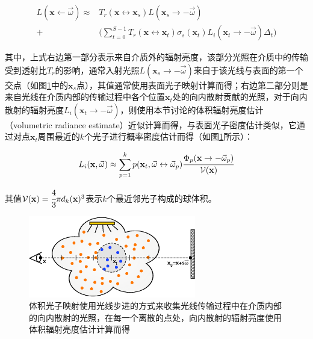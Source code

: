 \begin{equation}
\begin{aligned}
	L(\mathbf{x}\leftarrow\vec{\omega})\approx &T_r(\mathbf{x}\leftrightarrow\mathbf{x}_s)L(\mathbf{x}_s\to -\vec{\omega})\\ +&\Biggl(\sum^{S-1}_{t=0}T_r(\mathbf{x}\leftrightarrow\mathbf{x}_t)\sigma_s(\mathbf{x}_t)L_i(\mathbf{x}_t\to -\vec{\omega})\Delta_t\Biggl)
\end{aligned}
\end{equation}

其中，上式右边第一部分表示来自介质外的辐射亮度，该部分光照在介质中的传输受到透射比$T_r$的影响，通常入射光照$L(\mathbf{x}_s\to -\vec{\omega})$来自于该光线与表面的第一个交点（如图\ref{f:pm-vpm-ray-marching}中的$\mathbf{x}_s$点），其值通常使用表面光子映射计算而得；右边第二部分则是来自光线在介质内部的传输过程中各个位置$\mathbf{x}_t$处的向内散射贡献的光照，对于向内散射的辐射亮度$L_i(\mathbf{x}_t\to -\vec{\omega})$，则使用本节讨论的体积辐射亮度估计（volumetric radiance estimate）近似计算而得，与表面光子密度估计类似，它通过对点$\mathbf{x}_t$周围最近的$k$个光子进行概率密度估计而得（如图\ref{f:pm-vpm-ray-marching}所示）：

\begin{equation}
	L_i(\mathbf{x},\vec{\omega})\approx\sum^{k}_{p=1}p(\mathbf{x}_t,\vec{\omega}\leftrightarrow\vec{\omega}_p) \cfrac{\Phi_p(\mathbf{x}\to-\vec{\omega}_p)}{\mathcal{V}(\mathbf{x})}
\end{equation}

\noindent 其值$\mathcal{V}(\mathbf{x})= \cfrac{4}{3}\pi d_k(\mathbf{x})^{3}$表示$k$个最近邻光子构成的球体积。

\begin{figure}
	\sidecaption
	\includegraphics[width=0.65\textwidth]{figures/pm/vpm-ray-marching}
	\caption{体积光子映射使用光线步进的方式来收集光线传输过程中在介质内部的向内散射的光照，在每一个离散的点处，向内散射的辐射亮度使用体积辐射亮度估计计算而得}
	\label{f:pm-vpm-ray-marching}
\end{figure}





